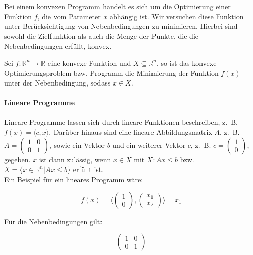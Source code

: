 Bei einem konvexen Programm handelt es sich um die Optimierung einer Funktion $f$, die vom Parameter $x$ abhängig ist. Wir versuchen diese Funktion unter Berücksichtigung von Nebenbedingungen zu minimieren. Hierbei sind sowohl die Zielfunktion als auch die Menge der Punkte, die die Nebenbedingungen erfüllt, konvex.

\begin{Def}
Sei $f: \mathbb{R}^{n} \rightarrow \mathbb{R}$ eine konvexe Funktion und $X \subseteq \mathbb{R}^{n}$, so ist das konvexe Optimierungsproblem bzw. Programm die Minimierung der Funktion $f(x)$ unter der Nebenbedingung, sodass $x \in X$.
\end{Def}

\paragraph{Lineare Programme}

Lineare Programme lassen sich durch lineare Funktionen beschreiben, z.~B. $f(x) = \langle c, x \rangle$. Darüber hinaus sind eine lineare Abbildungsmatrix $A$, z.~B. $A = \begin{pmatrix}1 & 0 \\ 0 & 1 \end{pmatrix}$, sowie ein Vektor $b$ und ein weiterer Vektor $c$, z.~B. $c = \begin{pmatrix}1 \\ 0 \end{pmatrix}$, gegeben. $x$ ist dann zulässig, wenn $x \in X$ mit $X: Ax \le b$ bzw. $X = \{x \in \mathbb{R}^{n} | Ax \le b\}$ erfüllt ist. \\
Ein Beispiel für ein lineares Programm wäre:

\begin{equation*}
f(x) = \langle \begin{pmatrix}1 \\ 0 \end{pmatrix}, \begin{pmatrix}x_{1} \\ x_{2} \end{pmatrix} \rangle = x_{1}
\end{equation*}

Für die Nebenbedingungen gilt:

\begin{equation*}
\begin{pmatrix}1 & 0 \\ 0 & 1 \end{pmatrix}
\end{equation*}

